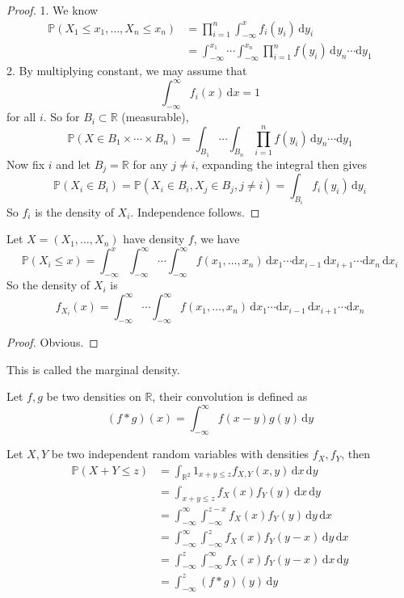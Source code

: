 \begin{proof}
    1. We know
    \begin{align*}
        \mathbb P(X_1\le x_1,\ldots,X_n\le x_n)&=\prod_{i=1}^n\int_{-\infty}^xf_i(y_i)\,\mathrm dy_i\\
        &=\int_{-\infty}^{x_1}\cdots\int_{-\infty}^{x_n}\prod_{i=1}^nf(y_i)\,\mathrm dy_n\cdots\mathrm dy_1
    \end{align*}
    2. By multiplying constant, we may assume that
    $$\int_{-\infty}^\infty f_i(x)\,\mathrm dx=1$$
    for all $i$.
    So for $B_i\subset\mathbb R$ (measurable),
    $$\mathbb P(X\in B_1\times\cdots\times B_n)=\int_{B_1}\cdots\int_{B_n}\prod_{i=1}^nf(y_i)\,\mathrm dy_n\cdots\mathrm dy_1$$
    Now fix $i$ and let $B_j=\mathbb R$ for any $j\neq i$, expanding the integral then gives
    $$\mathbb P(X_i\in B_i)=\mathbb P(X_i\in B_i,X_j\in B_j,j\neq i)=\int_{B_i}f_i(y_i)\,\mathrm dy_i$$
    So $f_i$ is the density of $X_i$.
    Independence follows.
\end{proof}
\begin{proposition}
    Let $X=(X_1,\ldots,X_n)$ have density $f$, we have
    $$\mathbb P(X_i\le x)=\int_{-\infty}^x\int_{-\infty}^\infty\cdots\int_{-\infty}^\infty f(x_1,\ldots,x_n)\,\mathrm dx_1\cdots\mathrm dx_{i-1}\,\mathrm dx_{i+1}\cdots\mathrm dx_n\,\mathrm dx_i$$
    So the density of $X_i$ is
    $$f_{X_i}(x)=\int_{-\infty}^\infty\cdots\int_{-\infty}^\infty f(x_1,\ldots,x_n)\,\mathrm dx_1\cdots\mathrm dx_{i-1}\,\mathrm dx_{i+1}\cdots\mathrm dx_n$$
\end{proposition}
\begin{proof}
    Obvious.
\end{proof}
\begin{definition}
    This is called the marginal density.
\end{definition}
\begin{definition}
    Let $f,g$ be two densities on $\mathbb R$, their convolution is defined as
    $$(f\ast g)(x)=\int_{-\infty}^\infty f(x-y)g(y)\,\mathrm dy$$
\end{definition}
Let $X,Y$ be two independent random variables with densities $f_X,f_Y$, then
\begin{align*}
    \mathbb P(X+Y\le z)&=\int_{\mathbb R^2}1_{x+y\le z}f_{X,Y}(x,y)\,\mathrm dx\,\mathrm dy\\
    &=\int_{x+y\le z}f_X(x)f_Y(y)\,\mathrm dx\,\mathrm dy\\
    &=\int_{-\infty}^\infty\int_{-\infty}^{z-x}f_X(x)f_Y(y)\,\mathrm dy\,\mathrm dx\\
    &=\int_{-\infty}^\infty\int_{-\infty}^zf_X(x)f_Y(y-x)\,\mathrm dy\,\mathrm dx\\
    &=\int_{-\infty}^z\int_{-\infty}^\infty f_X(x)f_Y(y-x)\,\mathrm dx\,\mathrm dy\\
    &=\int_{-\infty}^z(f\ast g)(y)\,\mathrm dy
\end{align*}

